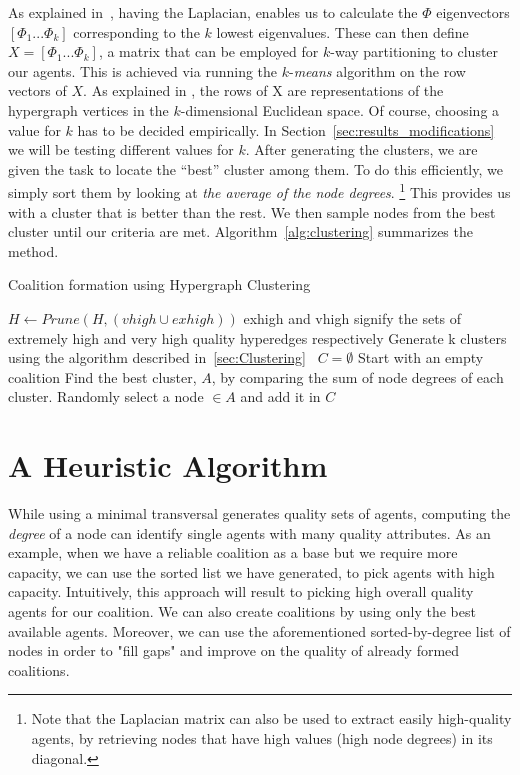 As explained in~\cite{zhou2006learning}, having the Laplacian, enables us to calculate the $\Phi$ eigenvectors $[\Phi_1 ... \Phi_k]$ corresponding to the $k$ lowest eigenvalues. These can then define $X = [\Phi_1 ... \Phi_k]$, a matrix that can be employed for $k$-way partitioning to cluster our agents. This is achieved via running the $k$-{\em means} algorithm \cite{hartigan1979algorithm} on the row vectors of $X$\cite{zhou2006learning}. As explained in \cite{zhou2006learning}, the rows of X are representations of the hypergraph vertices in the $k$-dimensional Euclidean space. Of course, choosing a value for $k$ has to be decided empirically. In Section~\ref{sec:results_modifications} we will be testing different values for $k$. 
After generating the clusters, we are given the task to locate the ``best'' cluster among them. To do this efficiently, we simply sort them by looking at {\em the average of the node degrees}.
\footnote{Note that the Laplacian matrix can also be used to extract easily high-quality agents, by retrieving nodes that have high values (high node degrees) in its diagonal.}
This provides us with a cluster that is better than the rest. We then sample nodes from the best cluster until our criteria are met. Algorithm~\ref{alg:clustering} summarizes the method.

\begin{algorithm}
	\caption{Coalition formation using Hypergraph Clustering}\label{alg:clustering}
	\begin{algorithmic}[1]
		\State $H \gets Prune(H, (vhigh \cup exhigh))$ \Comment exhigh and vhigh signify the sets of extremely high and very high quality hyperedges respectively
		\State Generate k clusters using the algorithm described in~\ref{sec:Clustering}~\cite{zhou2006learning}
		\State $C = \emptyset$ \Comment Start with an empty coalition
		\State Find the best cluster, $A$, by comparing the sum of node degrees of each cluster.
		\State Randomly select a node $\in A $ and add it in $C$
		\EndWhile        
		
		\EndProcedure
	\end{algorithmic}
\end{algorithm}

\section{A Heuristic Algorithm} \label{sec:heuristic}
While using a minimal transversal generates quality sets of agents, computing the {\em degree} of a node can identify single agents with many quality attributes. As an example, when we have a reliable coalition as a base but we require more capacity, we can use the sorted list we have generated, to pick agents with high capacity. Intuitively, this approach will result to picking high overall quality agents for our coalition. We can also create coalitions by using only the best available agents. Moreover, we can use the aforementioned sorted-by-degree list of nodes in order to "fill gaps" and improve on the quality of already formed coalitions. 

